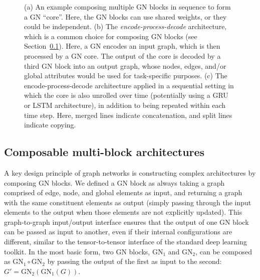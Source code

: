 \begin{figure}[t!]
{}
    \caption{(a) An example composing multiple GN blocks in sequence to form a GN ``core''. Here, the GN blocks can use shared weights, or they could be independent. (b) The \emph{encode-process-decode} architecture, which is a common choice for composing GN blocks (see Section~\ref{sec:dp-composable}). Here, a GN encodes an input graph, which is then processed by a GN core. The output of the core is decoded by a third GN block into an output graph, whose nodes, edges, and/or global attributes would be used for task-specific purposes. (c) The encode-process-decode architecture applied in a sequential setting in which the core is also unrolled over time (potentially using a GRU or LSTM architecture), in addition to being repeated within each time step. Here, merged lines indicate concatenation, and split lines indicate copying.}
    \label{fig:gn-enc-proc-dec}
\end{figure}


\subsection{Composable multi-block architectures} 
\label{sec:dp-composable}

A key design principle of graph networks is constructing complex architectures by composing GN blocks. We defined a GN block as always taking a graph comprised of edge, node, and global elements as input, and returning a graph with the same constituent elements as output (simply passing through the input elements to the output when those elements are not explicitly updated). This graph-to-graph input/output interface ensures that the output of one GN block can be passed as input to another, even if their internal configurations are different, similar to the tensor-to-tensor interface of the standard deep learning toolkit. In the most basic form, two GN blocks, $\mathrm{GN}_1$ and $\mathrm{GN}_2$, can be composed as $\mathrm{GN}_1 \circ \mathrm{GN}_2$ by passing the output of the first as input to the second: $G' = \mathrm{GN}_2(\mathrm{GN}_1(G))$. 

